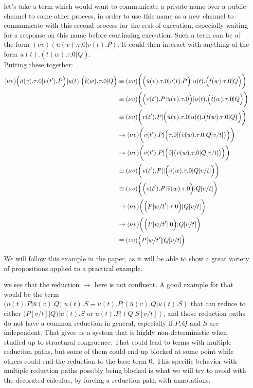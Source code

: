 \example let's take a term which would want to communicate a private name over a public channel to some other process, in order to use this name as a new channel to communicate with this second process for the rest of execution, especially waiting for a response on this name before continuing execution. Such a term can be of the form $(\nu v)(\bar{u}(v).\tau.0|v(t).P)$. It could then interact with anything of the form $u(t).(\bar{t}(w).\tau.0|Q)$.\\
Putting these together:
\begin{align*}
(\nu v)\Bigl(\bar{u}(v).\tau.0|v(t').P\Bigr)|u(t).\Bigl(\bar{t}(w).\tau.0|Q\Bigr) &\equiv (\nu v)\biggl(\Bigl(\bar{u}(v).\tau.0|v(t).P\Bigr)|u(t).\Bigl(\bar{t}(w).\tau.0|Q\Bigr)\biggr)\\
&\equiv (\nu v)\biggl(\Bigl(v(t').P|\bar{u}(v).\tau.0\Bigr)|u(t).\Bigl(\bar{t}(w).\tau.0|Q\Bigr)\biggr)\\
&\equiv (\nu v)\biggl(v(t').P|\Bigl(\bar{u}(v).\tau.0|u(t).\bigl(\bar{t}(w).\tau.0|Q\bigr)\Bigr)\biggr)\\
&\to (\nu v)\biggl(v(t').P|\Bigl(\tau.0|\bigl(\bar{v}(w).\tau.0|Q[v/t]\bigr)\Bigr)\biggr)\\
&\to (\nu v)\biggl(v(t').P|\Bigl(0|\bigl(\bar{v}(w).\tau.0|Q[v/t]\bigr)\Bigr)\biggr)\\
&\equiv (\nu v)\biggl(v(t').P||\Bigl(\bar{v}(w).\tau.0|Q[v/t]\Bigr)\biggr)\\
&\equiv (\nu v)\biggl(\Bigl(v(t').P|\bar{v}(w).\tau.0\Bigr)|Q[v/t]\biggr)\\
&\to (\nu v)\biggl(\Bigl(P[w/t']|\tau.0\Bigr)|Q[v/t]\biggr)\\
&\to (\nu v)\biggl(\Bigl(P[w/t']|0\Bigr)|Q[v/t]\biggr)\\
&\equiv (\nu v)\Bigl(P[w/t']|Q[v/t]\Bigr)
\end{align*}

We will follow this example in the paper, as it will be able to show a great variety of propositions applied to a practical example.

\remark we see that the reduction $\to$ here is not confluent. A good example for that would be the term\\
$(u(t).P|\bar{u}(v).Q)|u(t).S \equiv u(t).P|(\bar{u}(v).Q|u(t).S)$ that can reduce to either $(P[v/t]|Q)|u(t).S$ or $u(t).P|(Q|S[v/t])$, and those reduction paths do not have a common reduction in general, especially if $P,Q$ and $S$ are independent. That gives us a system that is highly non-deterministic when studied up to structural congruence. That could lead to terms with multiple reduction paths, but some of them could end up blocked at some point while others could end the reduction to the base term 0. This specific behavior with multiple reduction paths possibly being blocked is what we will try to avoid with the decorated calculus, by forcing a reduction path with annotations.

